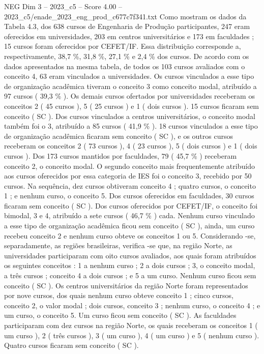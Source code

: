 \begin{textsample}{NEG Dim 3 – 2023\_c5 – Score 4.00 – 2023\_c5/enade\_2023\_eng\_prod\_c677c7f341.txt}
Como mostram os dados da Tabela 4.3, dos 638 cursos de Engenharia de Produção participantes, 247 eram oferecidos em universidades, 203 em centros universitários e 173 em faculdades ; 15 cursos foram oferecidos por CEFET/IF.
Essa distribuição corresponde a, respectivamente, 38,7 \%, 31,8 \%, 27,1 \% e 2,4 \% dos cursos.
De acordo com os dados apresentados na mesma tabela, de todos os 103 cursos avaliados com o conceito 4, 63 eram vinculados a universidades.
Os cursos vinculados a esse tipo de organização acadêmica tiveram o conceito 3 como conceito modal, atribuído a 97 cursos ( 39,3 \% ).
Os demais cursos ofertados por universidades receberam os conceitos 2 ( 45 cursos ), 5 ( 25 cursos ) e 1 ( dois cursos ). 15 cursos ficaram sem conceito ( SC ).
Dos cursos vinculados a centros universitários, o conceito modal também foi o 3, atribuído a 85 cursos ( 41,9 \% ). 18 cursos vinculados a esse tipo de organização acadêmica ficaram sem conceito ( SC ), e os outros cursos receberam os conceitos 2 ( 73 cursos ), 4 ( 23 cursos ), 5 ( dois cursos ) e 1 ( dois cursos ).
Dos 173 cursos mantidos por faculdades, 79 ( 45,7 \% ) receberam conceito 2, o conceito modal.
O segundo conceito mais frequentemente atribuído aos cursos oferecidos por essa categoria de IES foi o conceito 3, recebido por 50 cursos.
Na sequência, dez cursos obtiveram conceito 4 ; quatro cursos, o conceito 1 ; e nenhum curso, o conceito 5.
Dos cursos oferecidos em faculdades, 30 cursos ficaram sem conceito ( SC ).
Dos cursos oferecidos por CEFET/IF, o conceito foi bimodal, 3 e 4, atribuído a sete cursos ( 46,7 \% ) cada.
Nenhum curso vinculado a esse tipo de organização acadêmica ficou sem conceito ( SC ), ainda, um curso recebeu conceito 2 e nenhum curso obteve os conceitos 1 ou 5.
Considerando -se, separadamente, as regiões brasileiras, verifica -se que, na região Norte, as universidades participaram com oito cursos avaliados, aos quais foram atribuídos os seguintes conceitos : 1 a nenhum curso ; 2 a dois cursos ; 3, o conceito modal, a três cursos ; conceito 4 a dois cursos ; e 5 a um curso.
Nenhum curso ficou sem conceito ( SC ).
Os centros universitários da região Norte foram representados por nove cursos, dos quais nenhum curso obteve conceito 1 ; cinco cursos, conceito 2, o valor modal ; dois cursos, conceito 3 ; nenhum curso, o conceito 4 ; e um curso, o conceito 5.
Um curso ficou sem conceito ( SC ).
As faculdades participaram com dez cursos na região Norte, os quais receberam os conceitos 1 ( um curso ), 2 ( três cursos ), 3 ( um curso ), 4 ( um curso ) e 5 ( nenhum curso ).
Quatro cursos ficaram sem conceito ( SC ).

\end{textsample}
